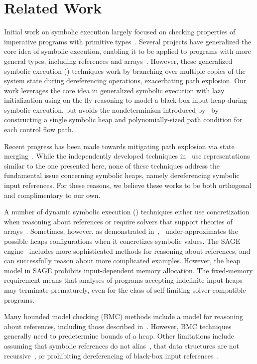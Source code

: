 \section{Related Work}
\label{related}

Initial work on symbolic execution largely focused on checking
properties of imperative programs with primitive
types~\cite{Clarke:76,King:76}.
Several projects have generalized the core idea of symbolic execution,
enabling it to be applied to programs with more general types,
including references and
arrays~\cite{GSE03,KiasanKunit,Cadar:2008,Rosner:2015}. However, these
generalized symbolic execution (\gsetxt{}) techniques work by branching over
multiple copies of the system state during dereferencing operations,
exacerbating path explosion.
Our work leverages the core idea in generalized symbolic execution
with lazy initialization using on-the-fly reasoning to model a
black-box input heap during symbolic execution, but avoids the
nondeterminism introduced by~\gsetxt{} by constructing a single
symbolic heap and polynomially-sized path condition for each control
flow path.

Recent progress has been made towards mitigating path explosion via state merging~\cite{Kuznetsov:2012,Sen:2014,Torlak:2014}. While the independently developed techniques in~\cite{Sen:2014,Torlak:2014} use representations similar to the one presented here, none of these techniques address the fundamental issue concerning symbolic heaps, namely dereferencing symbolic input references. For these reasons, we believe these works to be both orthogonal and complimentary to our own.

A number of dynamic symbolic execution (\dsetxt{}) techniques either use
concretization when reasoning about references or require solvers that
support theories of
arrays~\cite{Godefroid:2005,Sen:2005,Godefroid:POPL07,Tillmann:2008}. Sometimes,
however, as demonstrated in~\cite{Elkarablieh:2009},~\dsetxt{}
under-approximates the possible heaps configurations when it
concretizes symbolic values. The SAGE~\dsetxt{}
engine~\cite{Elkarablieh:2009} includes more sophisticated methods for
reasoning about references, and can successfully reason about more
complicated examples. However, the heap model in SAGE prohibits
input-dependent memory allocation. The fixed-memory requirement means
that analyses of programs accepting indefinite input heaps may
terminate prematurely, even for the class of self-limiting
solver-compatible programs.

Many bounded model checking (BMC) methods include a model for
reasoning about references, including those described
in~\cite{Clarke:2004,Barnett:2006,Xie:2005,Babic:2007,Dillig:2011}. However,
BMC techniques generally need to predetermine bounds of a heap. Other
limitations include assuming that symbolic references do not
alias~\cite{Xie:2005,Babic:2007}, that data structures are not
recursive~\cite{Dillig:2011}, or prohibiting dereferencing of
black-box input references~\cite{Clarke:2004}.

